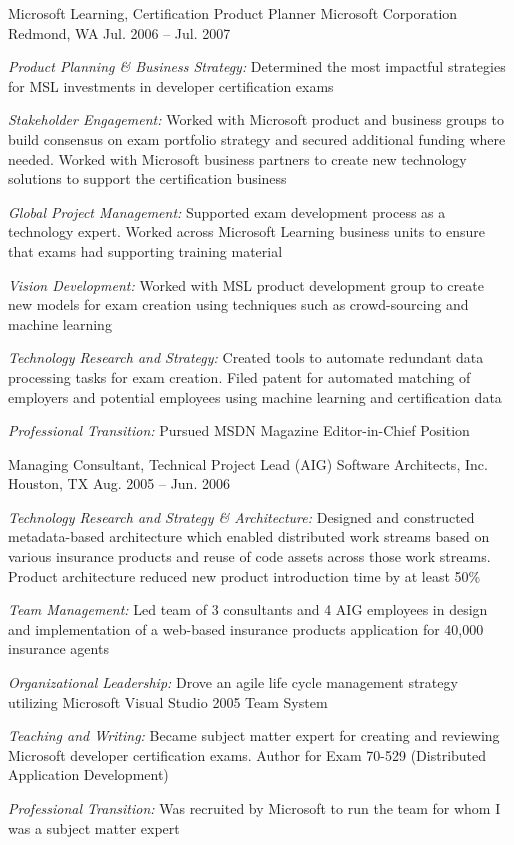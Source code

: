 \begin{cventries}
\cventry 
{Microsoft Learning, Certification Product Planner}
{Microsoft Corporation}
{Redmond, WA}
{Jul. 2006 – Jul. 2007}
{ %
\begin{cvitems}
\item {\emph{Product Planning \& Business Strategy:} Determined the most impactful strategies for MSL investments in developer certification exams }
\item {\emph{Stakeholder Engagement:} Worked with Microsoft product and business groups to build consensus on exam portfolio strategy and secured additional funding where needed. Worked with Microsoft business partners to create new technology solutions to support the certification business }
\item {\emph{Global Project Management:} Supported exam development process as a technology expert. Worked across Microsoft Learning business units to ensure that exams had supporting training material }
\item {\emph{Vision Development:} Worked with MSL product development group to create new models for exam creation using techniques such as crowd-sourcing and machine learning }
\item {\emph{Technology Research and Strategy:} Created tools to automate redundant data processing tasks for exam creation. Filed patent for automated matching of employers and potential employees using machine learning and certification data }
\item {\emph{Professional Transition:} Pursued MSDN Magazine Editor-in-Chief Position }
\end{cvitems}
}


\cventry 
{Managing Consultant, Technical Project Lead (AIG)}
{Software Architects, Inc.}
{Houston, TX}
{Aug. 2005 – Jun. 2006}
{ %
\begin{cvitems}
\item {\emph{Technology Research and Strategy \& Architecture:} Designed and constructed metadata-based architecture which enabled distributed work streams based on various insurance products and reuse of code assets across those work streams. Product architecture reduced new product introduction time by at least 50\% }
\item {\emph{Team Management:} Led team of 3 consultants and 4 AIG employees in design and implementation of a web-based insurance products application for 40,000 insurance agents }
\item {\emph{Organizational Leadership:} Drove an agile life cycle management strategy utilizing Microsoft Visual Studio 2005 Team System }
\item {\emph{Teaching and Writing:} Became subject matter expert for creating and reviewing Microsoft developer certification exams. Author for Exam 70-529 (Distributed Application Development) }
\item {\emph{Professional Transition:} Was recruited by Microsoft to run the team for whom I was a subject matter expert }
\end{cvitems}
}


\end{cventries}
